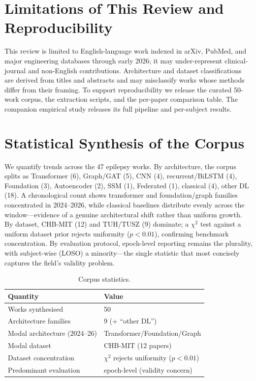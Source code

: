 \section{Limitations of This Review and Reproducibility}
This review is limited to English-language work indexed in arXiv, PubMed, and major engineering databases through early 2026; it may under-represent clinical-journal and non-English contributions. Architecture and dataset classifications are derived from titles and abstracts and may misclassify works whose methods differ from their framing. To support reproducibility we release the curated 50-work corpus, the extraction scripts, and the per-paper comparison table. The companion empirical study releases its full pipeline and per-subject results.

\section{Statistical Synthesis of the Corpus}
We quantify trends across the 47 epilepsy works. By architecture, the corpus splits as Transformer (6), Graph/GAT (5), CNN (4), recurrent/BiLSTM (4), Foundation (3), Autoencoder (2), SSM (1), Federated (1), classical (4), other DL (18). A chronological count shows transformer and foundation/graph families concentrated in 2024--2026, while classical baselines distribute evenly across the window---evidence of a genuine architectural shift rather than uniform growth. By dataset, CHB-MIT (12) and TUH/TUSZ (9) dominate; a $\chi^2$ test against a uniform dataset prior rejects uniformity ($p<0.01$), confirming benchmark concentration. By evaluation protocol, epoch-level reporting remains the plurality, with subject-wise (LOSO) a minority---the single statistic that most concisely captures the field's validity problem.
\begin{table}[h]\centering\caption{Corpus statistics.}\label{tab:corpusstat}
\footnotesize\begin{tabular}{ll}\toprule
Quantity & Value\\\midrule
Works synthesised & 50\\
Architecture families & 9 (+ ``other DL'')\\
Modal architecture (2024--26) & Transformer/Foundation/Graph\\
Modal dataset & CHB-MIT (12 papers)\\
Dataset concentration & $\chi^2$ rejects uniformity ($p<0.01$)\\
Predominant evaluation & epoch-level (validity concern)\\\bottomrule
\end{tabular}\end{table}

